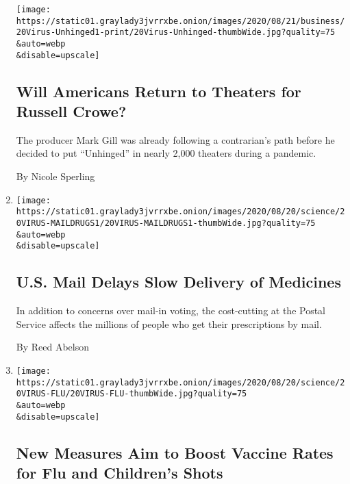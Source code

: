 \begin{enumerate}
  \texttt{[image: https://static01.graylady3jvrrxbe.onion/images/2020/08/21/business/20Virus-Unhinged1-print/20Virus-Unhinged-thumbWide.jpg?quality=75\\\&auto=webp\\\&disable=upscale]}

  \hypertarget{will-americans-return-to-theaters-for-russell-crowe}{%
  \subsection{Will Americans Return to Theaters for Russell
  Crowe?}\label{will-americans-return-to-theaters-for-russell-crowe}}

  The producer Mark Gill was already following a contrarian's path
  before he decided to put ``Unhinged'' in nearly 2,000 theaters during
  a pandemic.

  By Nicole Sperling
\item
  \href{/2020/08/20/health/Covid-us-mail-prescription-drugs.html}{}

  \texttt{[image: https://static01.graylady3jvrrxbe.onion/images/2020/08/20/science/20VIRUS-MAILDRUGS1/20VIRUS-MAILDRUGS1-thumbWide.jpg?quality=75\\\&auto=webp\\\&disable=upscale]}

  \hypertarget{us-mail-delays-slow-delivery-of-medicines}{%
  \subsection{U.S. Mail Delays Slow Delivery of
  Medicines}\label{us-mail-delays-slow-delivery-of-medicines}}

  In addition to concerns over mail-in voting, the cost-cutting at the
  Postal Service affects the millions of people who get their
  prescriptions by mail.

  By Reed Abelson
\item
  \href{/2020/08/20/health/coronavirus-flu-vaccine.html}{}

  \texttt{[image: https://static01.graylady3jvrrxbe.onion/images/2020/08/20/science/20VIRUS-FLU/20VIRUS-FLU-thumbWide.jpg?quality=75\\\&auto=webp\\\&disable=upscale]}

  \hypertarget{new-measures-aim-to-boost-vaccine-rates-for-flu-and-childrens-shots}{%
  \subsection{New Measures Aim to Boost Vaccine Rates for Flu and
  Children's
  Shots}\label{new-measures-aim-to-boost-vaccine-rates-for-flu-and-childrens-shots}}


\end{enumerate}
